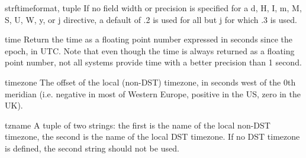 \begin{funcdesc}{strftime}{format, tuple}
      If no field width or precision is specified for a d, H, I, m, M, S, U,
      W, y, or j directive, a default of .2 is used for all but j for which
      .3 is used.

\end{funcdesc}

\begin{funcdesc}{time}{}
Return the time as a floating point number expressed in seconds since
the epoch, in UTC.  Note that even though the time is always returned
as a floating point number, not all systems provide time with a better
precision than 1 second.
\end{funcdesc}

\begin{datadesc}{timezone}
The offset of the local (non-DST) timezone, in seconds west of the 0th
meridian (i.e. negative in most of Western Europe, positive in the US,
zero in the UK).
\end{datadesc}

\begin{datadesc}{tzname}
A tuple of two strings: the first is the name of the local non-DST
timezone, the second is the name of the local DST timezone.  If no DST
timezone is defined, the second string should not be used.
\end{datadesc}

